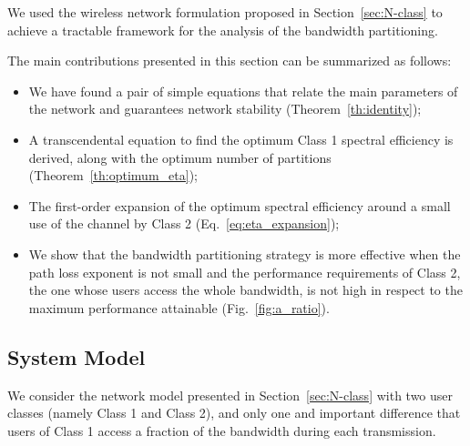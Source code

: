 We used the wireless network formulation proposed in Section~\ref{sec:N-class} to achieve a tractable framework for the analysis of the bandwidth partitioning.

The main contributions presented in this section can be summarized as follows:
\begin{itemize}
    \item We have found a pair of simple equations that relate the main parameters of the network and guarantees network stability (Theorem~\ref{th:identity});
    \item A transcendental equation to find the optimum Class 1 spectral efficiency is derived, along with the optimum number of partitions (Theorem~\ref{th:optimum_eta});
    \item The first-order expansion of the optimum spectral efficiency around a small use of the channel by Class 2 (Eq.~\eqref{eq:eta_expansion});
    \item We show that the bandwidth partitioning strategy is more effective when the path loss exponent is not small and the performance requirements of Class 2, the one whose users access the whole bandwidth, is not high in respect to the maximum performance attainable (Fig.~\ref{fig:a_ratio}).
\end{itemize}


\subsection{System Model} \label{sec:sysmod_M}

We consider the network model presented in Section~\ref{sec:N-class} with two user classes (namely Class 1 and Class 2), and only one and important difference that users of Class 1 access a fraction of the bandwidth during each transmission.

